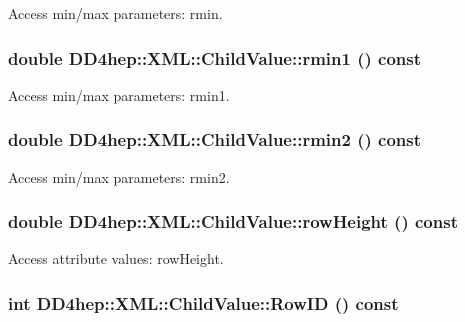Access min/max parameters: rmin. \hypertarget{struct_d_d4hep_1_1_x_m_l_1_1_child_value_ac3e6908c526cb563ed89264319f5ec07}{
\subsubsection[{rmin1}]{\setlength{\rightskip}{0pt plus 5cm}double DD4hep::XML::ChildValue::rmin1 () const}}
\label{struct_d_d4hep_1_1_x_m_l_1_1_child_value_ac3e6908c526cb563ed89264319f5ec07}


Access min/max parameters: rmin1. \hypertarget{struct_d_d4hep_1_1_x_m_l_1_1_child_value_a20c8bfd0bea4a2d3a84556cb75289f72}{
\subsubsection[{rmin2}]{\setlength{\rightskip}{0pt plus 5cm}double DD4hep::XML::ChildValue::rmin2 () const}}
\label{struct_d_d4hep_1_1_x_m_l_1_1_child_value_a20c8bfd0bea4a2d3a84556cb75289f72}


Access min/max parameters: rmin2. \hypertarget{struct_d_d4hep_1_1_x_m_l_1_1_child_value_aa717d9a434a61f445cdf095ed73261f4}{
\subsubsection[{rowHeight}]{\setlength{\rightskip}{0pt plus 5cm}double DD4hep::XML::ChildValue::rowHeight () const}}
\label{struct_d_d4hep_1_1_x_m_l_1_1_child_value_aa717d9a434a61f445cdf095ed73261f4}


Access attribute values: rowHeight. \hypertarget{struct_d_d4hep_1_1_x_m_l_1_1_child_value_aa2946fe9fb149083ff6e803bea04d7d8}{
\subsubsection[{RowID}]{\setlength{\rightskip}{0pt plus 5cm}int DD4hep::XML::ChildValue::RowID () const}}
\label{struct_d_d4hep_1_1_x_m_l_1_1_child_value_aa2946fe9fb149083ff6e803bea04d7d8}


